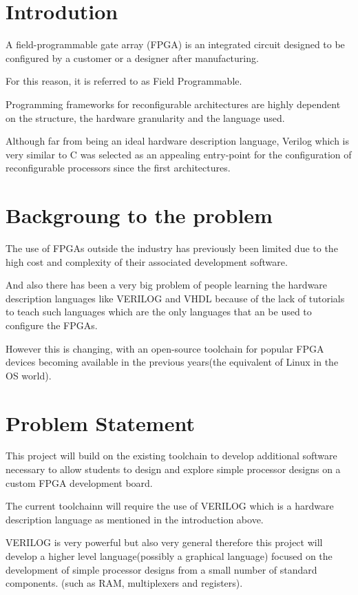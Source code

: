 \documentclass{article}
\begin{document}
\begin{flushleft}
\section{Introdution}
A field-programmable gate array (FPGA) is an integrated circuit designed to be configured by a customer or a designer after manufacturing.

For this reason, it is referred to as Field Programmable.

Programming frameworks for reconfigurable architectures are highly dependent on the structure, the hardware granularity and the language used. 

Although far from being an ideal hardware description language, Verilog which is very similar to C was selected as an appealing entry-point for the configuration of reconfigurable processors since the first architectures.

\section{Backgroung to the problem}
The use of FPGAs outside the industry has previously been limited due to the high cost and complexity of their associated development software.

And also there has been a very big problem of people learning the hardware description languages like VERILOG and VHDL because of the lack of tutorials to teach such languages which are the only languages that an be used to configure the FPGAs.

However this is changing, with an open-source toolchain for popular FPGA devices becoming available in the previous years(the equivalent of Linux in the OS world).

\section{Problem Statement}
This project will build on the existing toolchain to develop additional software necessary to allow students to design and explore simple processor designs on a custom FPGA development board.

The current toolchainn will require the use of VERILOG which is a hardware description language as mentioned in the introduction above.

VERILOG is very powerful but also very general therefore this project will develop a higher level language(possibly a graphical language) focused on the development of simple processor designs from a small number of standard components.
(such as RAM, multiplexers and registers).


\end{flushleft}
\end{document}
